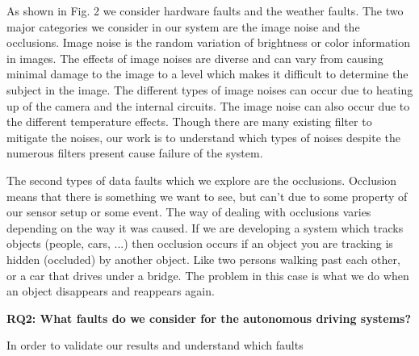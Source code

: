 As shown in Fig. 2 we consider hardware faults and the weather faults. The two major categories we consider in our system are the image noise and the occlusions. Image noise is the random variation of brightness or color information in images.
The effects of image noises are diverse and can vary from causing minimal damage to the image to
a level which makes it difficult to determine the subject in the image. The different types of image noises can occur due to heating up of the camera and the internal circuits. The image noise can also occur due to the different temperature effects. Though there are many existing filter to mitigate the noises, our work is to understand which types of noises despite the numerous filters present cause failure of the system. 

The second types of data faults which we explore are the occlusions. Occlusion means that there is something we want to see, but can't due to some property of our sensor setup or some event. The way of dealing with occlusions varies depending on the way it was caused. If we are developing a system which tracks objects (people, cars, ...) then occlusion occurs if an object you are tracking is hidden (occluded) by another object. Like two persons walking past each other, or a car that drives under a bridge. The problem in this case is what we do when an object disappears and reappears again.

\textbf{RQ2: What faults do we consider for the autonomous driving systems?}

In order to validate our results and understand which faults



